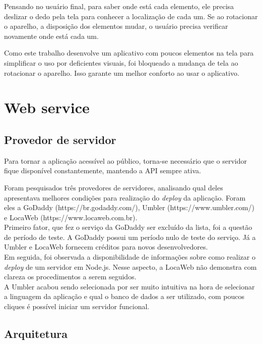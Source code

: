 \documentclass[
	12pt,				%
	oneside,			%
	a4paper,			%
	brazil				%
]{abntex2}
\begin{document}
Pensando no usuário final, para saber onde está cada elemento, ele precisa deslizar o dedo pela tela para conhecer a localização de cada um. Se ao rotacionar o aparelho, a disposição dos elementos mudar, o usuário precisa verificar novamente onde está cada um.

Como este trabalho desenvolve um aplicativo com poucos elementos na tela para simplificar o uso por deficientes visuais, foi bloqueado a mudança de tela ao rotacionar o aparelho. Isso garante um melhor conforto ao usar o aplicativo.


\section{Web service}

\subsection{Provedor de servidor}

Para tornar a aplicação acessível ao público, torna-se necessário que o servidor fique disponível constantemente, mantendo a API sempre ativa. 

Foram pesquisados três provedores de servidores, analisando qual deles apresentava melhores condições para realização do \textit{deploy} da aplicação. Foram eles a GoDaddy (https://br.godaddy.com/), Umbler (https://www.umbler.com/) e LocaWeb (https://www.locaweb.com.br).\\

Primeiro fator, que fez o serviço da GoDaddy ser excluído da lista, foi a questão de período de teste. A GoDaddy possui um período nulo de teste do serviço. Já a Umbler e LocaWeb fornecem créditos para novos desenvolvedores.\\

Em seguida, foi observada a disponibilidade de informações sobre como realizar o \textit{deploy} de um servidor em Node.js. Nesse aspecto, a LocaWeb não demonstra com clareza os procedimentos a serem seguidos.\\

A Umbler acabou sendo selecionada por ser muito intuitiva na hora de selecionar a linguagem da aplicação e qual o banco de dados a ser utilizado, com poucos cliques é possível iniciar um servidor funcional.


\subsection{Arquitetura}
\end{document}
